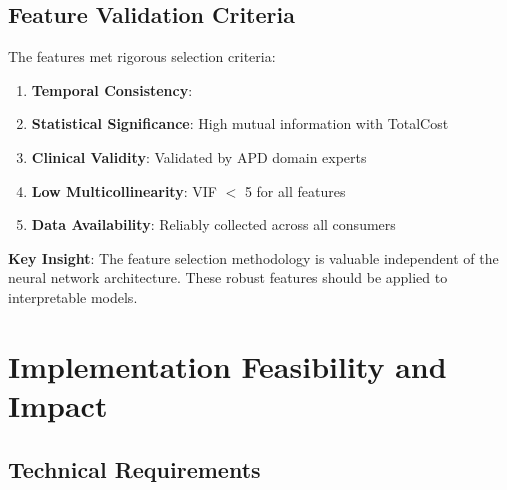 \subsection{Feature Validation Criteria}

The \ModelTenRobustFeatures{} features met rigorous selection criteria:

\begin{enumerate}
    \item \textbf{Temporal Consistency}: \ModelTenSelectionCriteria{}
    \item \textbf{Statistical Significance}: High mutual information with TotalCost
    \item \textbf{Clinical Validity}: Validated by APD domain experts
    \item \textbf{Low Multicollinearity}: VIF $<$ 5 for all features
    \item \textbf{Data Availability}: Reliably collected across all consumers
\end{enumerate}

\textbf{Key Insight}: The feature selection methodology is valuable independent of the neural network architecture. These \ModelTenRobustFeatures{} robust features should be applied to interpretable models.

\section{Implementation Feasibility and Impact}

\subsection{Technical Requirements}

